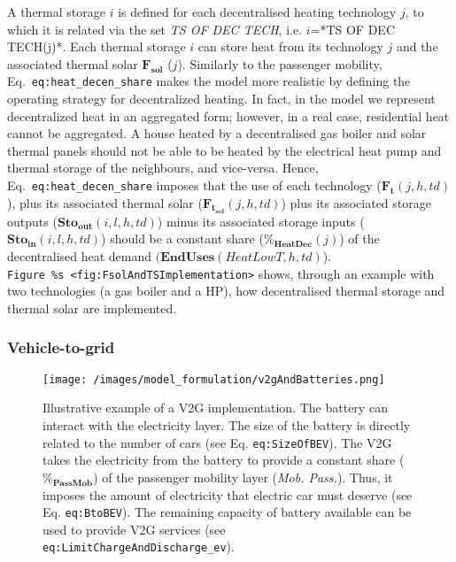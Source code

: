 \documentclass[
]{article}
\begin{document}
A thermal storage \(i\) is defined for each decentralised heating
technology \(j\), to which it is related via the set \emph{TS OF DEC
TECH}, i.e. \(i\)=*TS OF DEC TECH(j)*. Each thermal storage \(i\) can
store heat from its technology \(j\) and the associated thermal solar
\(\textbf{F}_{\textbf{sol}}\) (\(j\)). Similarly to the passenger
mobility, Eq.~\texttt{eq:heat\_decen\_share} makes the model more
realistic by defining the operating strategy for decentralized heating.
In fact, in the model we represent decentralized heat in an aggregated
form; however, in a real case, residential heat cannot be aggregated. A
house heated by a decentralised gas boiler and solar thermal panels
should not be able to be heated by the electrical heat pump and thermal
storage of the neighbours, and vice-versa. Hence,
Eq.~\texttt{eq:heat\_decen\_share} imposes that the use of each
technology (\(\textbf{F}_{\textbf{t}}(j,h,td)\)), plus its associated
thermal solar (\(\textbf{F}_{\textbf{t}_\textbf{sol}}(j,h,td)\)) plus
its associated storage outputs
(\(\textbf{Sto}_{\textbf{out}}(i,l,h,td)\)) minus its associated storage
inputs (\(\textbf{Sto}_{\textbf{in}}(i,l,h,td)\)) should be a constant
share (\(\textbf{\%}_{\textbf{HeatDec}}(j)
\)) of the decentralised heat demand
\((\textbf{EndUses}(HeatLowT,h,td)\)).
\texttt{Figure\ \%s\ \textless{}fig:FsolAndTSImplementation\textgreater{}}
shows, through an example with two technologies (a gas boiler and a HP),
how decentralised thermal storage and thermal solar are implemented.

\subsubsection{Vehicle-to-grid}\label{vehicle-to-grid}

\begin{figure}
\centering
\texttt{[image: /images/model\_formulation/v2gAndBatteries.png]}
\caption{Illustrative example of a V2G implementation. The battery can
interact with the electricity layer. The size of the battery is directly
related to the number of cars (see Eq. \texttt{eq:SizeOfBEV}). The V2G
takes the electricity from the battery to provide a constant share
(\(\textbf{\%}_{\textbf{PassMob}}
\)) of the passenger mobility layer (\emph{Mob. Pass.}). Thus, it
imposes the amount of electricity that electric car must deserve (see
Eq. \texttt{eq:BtoBEV}). The remaining capacity of battery available can
be used to provide V2G services (see
\texttt{eq:LimitChargeAndDischarge\_ev}).}
\end{figure}
\end{document}
